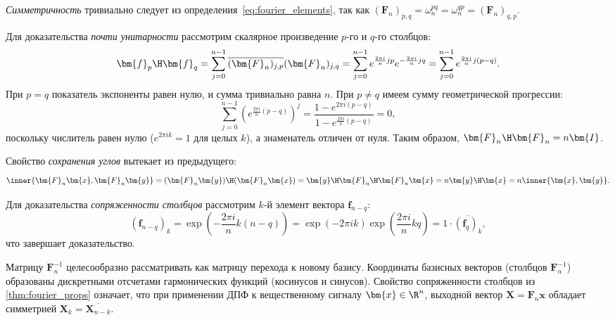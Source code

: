 \begin{tcbproof}
    \textit{Симметричность} тривиально следует из определения~\cref{eq:fourier_elements}, так как $(\bm{F}_n)_{p,q} = \omega_n^{pq} = \omega_n^{qp} = (\bm{F}_n)_{q,p}$.
    
    Для доказательства \textit{почти унитарности} рассмотрим скалярное произведение $p$-го и $q$-го столбцов:
    \begin{equation}
        \bm{f}_p\H \bm{f}_q = \sum_{j=0}^{n-1} \overline{(\bm{F}_n)_{j,p}} (\bm{F}_n)_{j,q} = \sum_{j=0}^{n-1} e^{\frac{2\pi i}{n} j p} e^{-\frac{2\pi i}{n} j q} = \sum_{j=0}^{n-1} e^{\frac{2\pi i}{n} j (p-q)}.
    \end{equation}
    При $p = q$ показатель экспоненты равен нулю, и сумма тривиально равна $n$. При $p \neq q$ имеем сумму геометрической прогрессии:
    \begin{equation}
        \sum_{j=0}^{n-1} \left( e^{\frac{2\pi i}{n} (p-q)} \right)^j = \frac{1 - e^{2\pi i (p-q)}}{1 - e^{\frac{2\pi i}{n} (p-q)}} = 0,
    \end{equation}
    поскольку числитель равен нулю ($e^{2\pi i k} = 1$ для целых $k$), а знаменатель отличен от нуля. Таким образом, $\bm{F}_n\H \bm{F}_n = n \bm{I}$.
    
    Свойство \textit{сохранения углов} вытекает из предыдущего:
    \begin{equation}
        \inner{\bm{F}_n \bm{x}, \bm{F}_n \bm{y}} = (\bm{F}_n \bm{y})\H (\bm{F}_n \bm{x}) = \bm{y}\H \bm{F}_n\H \bm{F}_n \bm{x} = n \bm{y}\H \bm{x} = n \inner{\bm{x}, \bm{y}}.
    \end{equation}
    
    Для доказательства \textit{сопряженности столбцов} рассмотрим $k$-й элемент вектора $\bm{f}_{n-q}$:
    \begin{equation}
        (\bm{f}_{n-q})_k = \exp\left(-\frac{2\pi i}{n} k(n-q)\right) = \exp(-2\pi i k) \exp\left(\frac{2\pi i}{n} k q\right) = 1 \cdot \overline{(\bm{f}_q)_k},
    \end{equation}
    что завершает доказательство.
\end{tcbproof}

\begin{tcbinsight}
    Матрицу $\bm{F}_n^{-1}$ целесообразно рассматривать как матрицу перехода к новому базису. Координаты базисных векторов (столбцов $\bm{F}_n^{-1}$) образованы дискретными отсчетами гармонических функций (косинусов и синусов). Свойство сопряженности столбцов из \cref{thm:fourier_props} означает, что при применении ДПФ к вещественному сигналу $\bm{x} \in \R^n$, выходной вектор $\bm{X} = \bm{F}_n \bm{x}$ обладает симметрией $\bm{X}_k = \overline{\bm{X}_{n-k}}$.
\end{tcbinsight}

